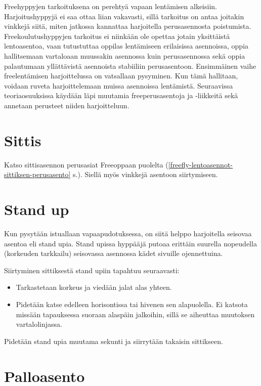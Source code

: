 
Freehyppyjen tarkoituksena on perehtyä vapaan lentämisen alkeisiin. Harjoitushyppyjä ei saa ottaa liian vakavasti, sillä tarkoitus on antaa joitakin vinkkejä siitä, miten jatkossa kannattaa harjoitella perusasennosta poistumista. Freekoulutushyppyjen tarkoitus ei niinkään ole opettaa jotain yksittäistä lentoasentoa, vaan tutustuttaa oppilas lentämiseen erilaisissa asennoissa, oppia hallitsemaan vartaloaan muussakin asennossa kuin perusasennossa sekä oppia palautumaan yllättävistä asennoista stabiiliin perusasentoon. Ensimmäinen vaihe freelentämisen harjoittelussa on vatsallaan pysyminen. Kun tämä hallitaan, voidaan ruveta harjoittelemaan muissa asennoissa lentämistä. Seuraavissa teoriaosuuksissa käydään läpi muutamia freeperusasentoja ja -liikkeitä sekä annetaan perusteet niiden harjoitteluun. 

\section{ Sittis }
\label{free-hyppaaminen-sittis}


Katso sittisasennon perusasiat Freeoppaan puolelta (\ref{freefly-lentoasennot-sittiksen-perusasento} s.\pageref{freefly-lentoasennot-sittiksen-perusasento}). Siellä myös vinkkejä asentoon siirtymiseen. 

\section{ Stand up }
\label{free-hyppaaminen-stand-up}


Kun pysytään istuallaan vapaapudotuksessa, on siitä helppo harjoitella seisovaa asentoa eli stand upia. Stand upissa hyppääjä putoaa erittäin suurella nopeudella (korkeuden tarkkailu) seisovassa asennossa kädet sivuille ojennettuina. 


Siirtyminen sittiksestä stand upiin tapahtuu seuraavasti: 

\begin{itemize}
\item  Tarkastetaan korkeus ja viedään jalat alas yhteen. 
\item  Pidetään katse edelleen horisontissa tai hivenen sen alapuolella. Ei katsota missään tapauksessa suoraan alaspäin jalkoihin, sillä se aiheuttaa muutoksen vartalolinjassa. 
\end{itemize}

Pidetään stand upia muutama sekunti ja siirrytään takaisin sittikseen. 

\section{ Palloasento }
\label{free-hyppaaminen-palloasento}


